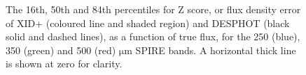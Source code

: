 \documentclass[useAMS,usenatbib]{mnras}
\begin{document}
\begin{figure}
\centering 
\caption{The 16th, 50th and 84th percentiles for Z score, or flux density error of \textsc{XID+} (coloured line and shaded region) and \textsc{DESPHOT}  (black solid and dashed lines), as a function of true flux, for the 250 (blue), 350 (green) and 500 (red) $\mathrm{\mu m}$ SPIRE bands. A horizontal thick line is shown at zero for clarity.}\label{fig:zscore}
\end{figure}
\end{document}
